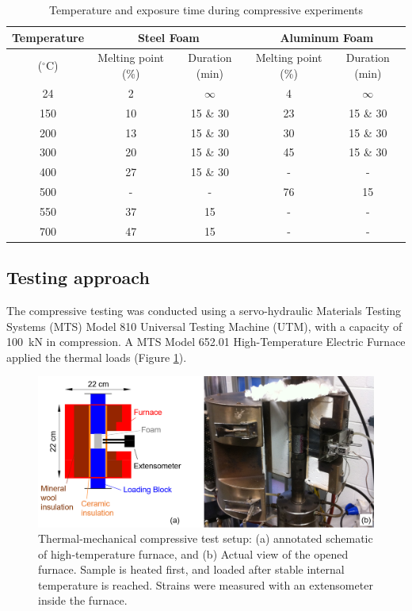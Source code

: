 \documentclass[review]{elsarticle}
\begin{document}
\begin{table}[htbp]
	\centering
	\caption{Temperature and exposure time during compressive experiments}
	\begin{tabular}{ccccc}
		\toprule
		{Temperature} & \multicolumn{2}{c}{Steel Foam}  & \multicolumn{2}{c}{Aluminum Foam} \\
		\midrule
		($^{\circ}\mathrm{C}$) & Melting point (\%) & Duration (min) & Melting point (\%) & Duration (min) \\
		\midrule
		24    & 2     & $\infty$     & 4     & $\infty$ \\
		150   & 10    & 15 \& 30 & 23    & 15 \& 30 \\
		200   & 13    & 15 \& 30 & 30    & 15 \& 30 \\
		300   & 20    & 15 \& 30 & 45    & 15 \& 30 \\
		400   & 27    & 15 \& 30 & -     & - \\
		500   & -     & -     & 76    & 15 \\
		550   & 37    & 15    & -     & - \\
		700   & 47    & 15    & -     & - \\
		\bottomrule
	\end{tabular}%
	\label{Tab1}%
\end{table}%

\subsection{Testing approach}

The compressive testing was conducted using a servo-hydraulic Materials Testing Systems (MTS) Model 810 Universal Testing Machine (UTM), with a capacity of 100~kN in compression. A MTS Model 652.01 High-Temperature Electric Furnace applied the thermal loads (Figure \ref{MTSFurnace}).

\begin{figure}[htbp]
	\begin{center}
		\includegraphics[width=0.95\linewidth]{Tex-Figures/Fig06.png}
		\caption{Thermal-mechanical compressive test setup: (a) annotated schematic of high-temperature furnace, and (b) Actual view of the opened furnace. Sample is heated first, and loaded after stable internal temperature is reached. Strains were measured with an extensometer inside the furnace.}
		\label{MTSFurnace}
	\end{center}
\end{figure}
\end{document}
